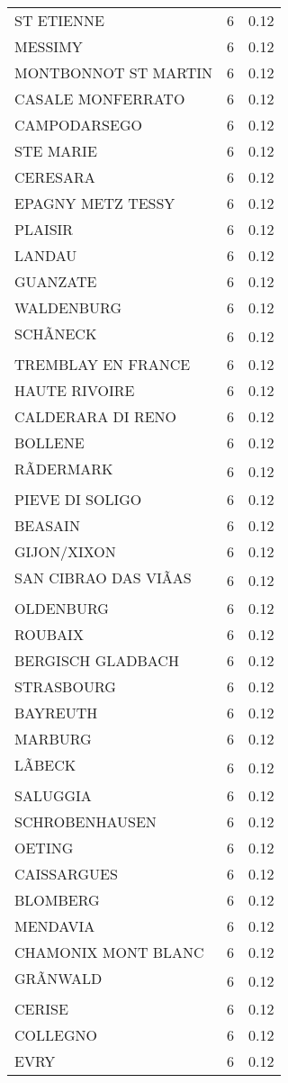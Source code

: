 \begin{table*}[htbp]
\begin{tabular}{lrr}
ST ETIENNE & 6 & 0.12 \\
MESSIMY & 6 & 0.12 \\
MONTBONNOT ST MARTIN & 6 & 0.12 \\
CASALE MONFERRATO & 6 & 0.12 \\
CAMPODARSEGO & 6 & 0.12 \\
STE MARIE & 6 & 0.12 \\
CERESARA & 6 & 0.12 \\
EPAGNY METZ TESSY & 6 & 0.12 \\
PLAISIR & 6 & 0.12 \\
LANDAU & 6 & 0.12 \\
GUANZATE & 6 & 0.12 \\
WALDENBURG & 6 & 0.12 \\
SCHÃNECK & 6 & 0.12 \\
TREMBLAY EN FRANCE & 6 & 0.12 \\
HAUTE RIVOIRE & 6 & 0.12 \\
CALDERARA DI RENO & 6 & 0.12 \\
BOLLENE & 6 & 0.12 \\
RÃDERMARK & 6 & 0.12 \\
PIEVE DI SOLIGO & 6 & 0.12 \\
BEASAIN & 6 & 0.12 \\
GIJON/XIXON & 6 & 0.12 \\
SAN CIBRAO DAS VIÃAS & 6 & 0.12 \\
OLDENBURG & 6 & 0.12 \\
ROUBAIX & 6 & 0.12 \\
BERGISCH GLADBACH & 6 & 0.12 \\
STRASBOURG & 6 & 0.12 \\
BAYREUTH & 6 & 0.12 \\
MARBURG & 6 & 0.12 \\
LÃBECK & 6 & 0.12 \\
SALUGGIA & 6 & 0.12 \\
SCHROBENHAUSEN & 6 & 0.12 \\
OETING & 6 & 0.12 \\
CAISSARGUES & 6 & 0.12 \\
BLOMBERG & 6 & 0.12 \\
MENDAVIA & 6 & 0.12 \\
CHAMONIX MONT BLANC & 6 & 0.12 \\
GRÃNWALD & 6 & 0.12 \\
CERISE & 6 & 0.12 \\
COLLEGNO & 6 & 0.12 \\
EVRY & 6 & 0.12 \\

\end{tabular}
\end{table*}
